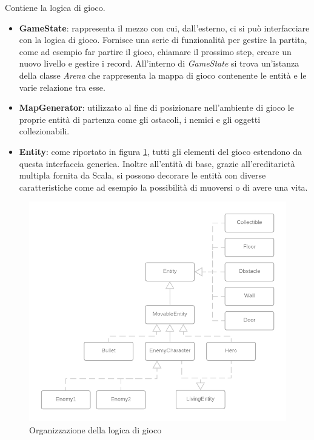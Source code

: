 Contiene la logica di gioco. 

\begin{itemize}
    \item \textbf{GameState}: rappresenta il mezzo con cui, dall'esterno, ci si può interfacciare con la logica di gioco. Fornisce una serie di funzionalità per gestire la partita, come ad esempio far partire il gioco, chiamare il prossimo step, creare un nuovo livello e gestire i record. All'interno di \textit{GameState} si trova un'istanza della classe \textit{Arena} che rappresenta la mappa di gioco contenente le entità e le varie relazione tra esse.
    
    \item \textbf{MapGenerator}: utilizzato al fine di posizionare nell'ambiente di gioco le proprie entità di partenza come gli ostacoli, i nemici e gli oggetti collezionabili.
    
    \item \textbf{Entity}: come riportato in figura \ref{model}, tutti gli elementi del gioco estendono da questa interfaccia generica. Inoltre  all'entità di base, grazie all'ereditarietà multipla fornita da Scala, si possono decorare le entità con diverse caratteristiche come ad esempio la possibilità di muoversi o di avere una vita. 
\end{itemize}

\begin{figure}[H]
  \includegraphics[width=15cm]{res/GAMELOGIC_Diagram.png}
  \caption{Organizzazione della logica di gioco}
  \label{model}
\end{figure}